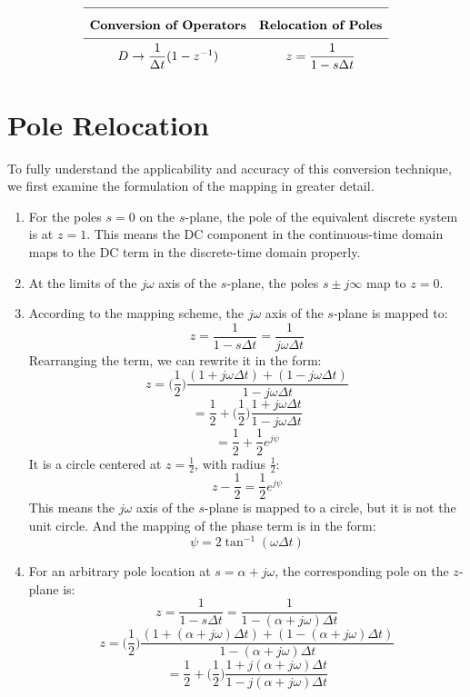 \documentclass{article}
\begin{document}
\[
\renewcommand{\arraystretch}{2}
\begin{array}{c c}
\hline
\textbf{Conversion of Operators} & \textbf{Relocation of Poles} \\
\hline
D \rightarrow \dfrac{1}{\Delta t}(1-z^{-1})
&
z = \dfrac{1}{1-s\Delta t}
\\
\end{array}
\]

\section{Pole Relocation}
To fully understand the applicability and accuracy of this conversion technique, we first examine the formulation of the mapping in greater detail.
\begin{enumerate}
    \item For the poles \(s=0\) on the \(s\)-plane, the pole of the equivalent discrete system is at \(z=1\). This means the DC component in the continuous-time domain maps to the DC term in the discrete-time domain properly.
    \item At the limits of the \(j\omega\) axis of the \(s\)-plane, the poles \(s\pm j\infty\) map to \(z=0\).
    \item According to the mapping scheme, the \(j\omega\) axis of the \(s\)-plane is mapped to:
    \[
    z = \frac{1}{1-s\Delta t}=\frac{1}{j\omega\Delta t}
    \]
    Rearranging the term, we can rewrite it in the form:
    \[
    z = \bigg(\frac{1}{2}\bigg)\frac{(1+j\omega\Delta t)+(1-j\omega\Delta t)}{1-j\omega\Delta t}
    \]
    \[
    = \frac{1}{2}+\bigg(\frac{1}{2}\bigg)\frac{1+j\omega\Delta t}{1-j\omega\Delta t}
    \]
    \[
    = \frac{1}{2} +\frac{1}{2}e^{j\psi}
    \]
    It is a circle centered at \(z=\frac{1}{2}\), with radius \(\frac{1}{2}\):
    \[
    z-\frac{1}{2}=\frac{1}{2}e^{j\psi}
    \]
    This means the \(j\omega\) axis of the \(s\)-plane is mapped to a circle, but it is not the unit circle. And the mapping of the phase term is in the form:
    \[
    \psi=2\tan^{-1}(\omega\Delta t)
    \]
    \item For an arbitrary pole location at \(s=\alpha+j\omega\), the corresponding pole on the \(z\)-plane is:
    \[
    z=\frac{1}{1-s\Delta t}=\frac{1}{1-(\alpha+j\omega)\Delta t}
    \]
    \[
    z = \bigg(\frac{1}{2}\bigg)\frac{(1+(\alpha+j\omega)\Delta t)+(1-(\alpha+j\omega)\Delta t)}{1-(\alpha+j\omega)\Delta t}
    \]
    \[
    = \frac{1}{2}+\bigg(\frac{1}{2}\bigg)\frac{1+j(\alpha+j\omega)\Delta t}{1-j(\alpha+j\omega)\Delta t}
    \]
    \[
\]
\end{enumerate}
\end{document}
